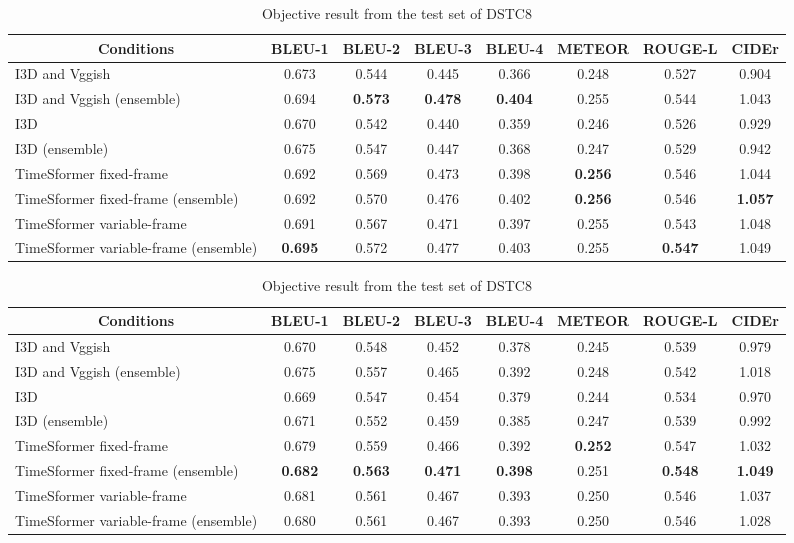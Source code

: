 \documentclass[letterpaper]{article} %
\begin{document}
\begin{table}[t]
  \centering
  \small
  \caption{Objective result from the test set of DSTC7}
  \label{tab:dstc7_result}
  \begin{tabular}{l|ccccccc}\hline
    \multicolumn{1}{c|}{Conditions} & BLEU-1 & BLEU-2 & BLEU-3 & BLEU-4 & METEOR & ROUGE-L & CIDEr \\ \hline
    I3D and Vggish \cite{Li2021bridging} & 0.673 & 0.544 & 0.445 & 0.366 & 0.248 & 0.527 & 0.904 \\
    I3D and Vggish (ensemble) & 0.694 & \textbf{0.573} & \textbf{0.478} & \textbf{0.404} & 0.255 & 0.544 & 1.043 \\
    I3D & 0.670 & 0.542 & 0.440 & 0.359 & 0.246 & 0.526 & 0.929 \\
    I3D (ensemble) & 0.675 & 0.547 & 0.447 & 0.368 & 0.247 & 0.529 & 0.942 \\
    TimeSformer fixed-frame & 0.692 & 0.569 & 0.473 & 0.398 & \textbf{0.256} & 0.546 & 1.044 \\
    TimeSformer fixed-frame (ensemble) & 0.692 & 0.570 & 0.476 & 0.402 & \textbf{0.256} & 0.546 & \textbf{1.057} \\
    TimeSformer variable-frame & 0.691 & 0.567 & 0.471 & 0.397 & 0.255 & 0.543 & 1.048 \\
    TimeSformer variable-frame (ensemble) & \textbf{0.695} & 0.572 & 0.477 & 0.403 & 0.255 & \textbf{0.547} & 1.049 \\ \hline
  \end{tabular}

  \centering
  \small
  \caption{Objective result from the test set of DSTC8}
  \label{tab:dstc8_result}
  \begin{tabular}{l|ccccccc}\hline
    \multicolumn{1}{c|}{Conditions} & BLEU-1 & BLEU-2 & BLEU-3 & BLEU-4 & METEOR & ROUGE-L & CIDEr \\ \hline
    I3D and Vggish \cite{Li2021bridging} & 0.670 & 0.548 & 0.452 & 0.378 & 0.245 & 0.539 & 0.979 \\
    I3D and Vggish (ensemble) & 0.675 & 0.557 & 0.465 & 0.392 & 0.248 & 0.542 & 1.018 \\
    I3D & 0.669 & 0.547 & 0.454 & 0.379 & 0.244 & 0.534 & 0.970 \\
    I3D (ensemble) & 0.671 & 0.552 & 0.459 & 0.385 & 0.247 & 0.539 & 0.992 \\
    TimeSformer fixed-frame & 0.679 & 0.559 & 0.466 & 0.392 & \textbf{0.252} & 0.547 & 1.032 \\
    TimeSformer fixed-frame (ensemble) & \textbf{0.682} & \textbf{0.563} & \textbf{0.471} & \textbf{0.398} & 0.251 & \textbf{0.548} & \textbf{1.049} \\
    TimeSformer variable-frame & 0.681 & 0.561 & 0.467 & 0.393 & 0.250 & 0.546 & 1.037 \\
    TimeSformer variable-frame (ensemble) & 0.680 & 0.561 & 0.467 & 0.393 & 0.250 & 0.546 & 1.028 \\ \hline
  \end{tabular}


\end{table}
\end{document}
